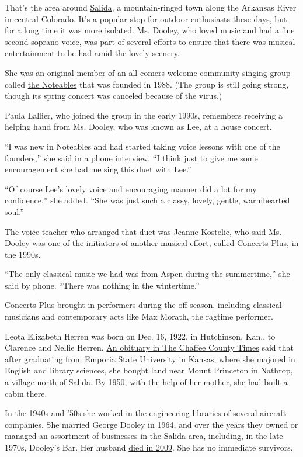 That's the area around \href{http://salida.com/}{Salida}, a
mountain-ringed town along the Arkansas River in central Colorado. It's
a popular stop for outdoor enthusiasts these days, but for a long time
it was more isolated. Ms. Dooley, who loved music and had a fine
second-soprano voice, was part of several efforts to ensure that there
was musical entertainment to be had amid the lovely scenery.

She was an original member of an all-comers-welcome community singing
group called \href{http://www.salidasings.org/noteables.html}{the
Noteables} that was founded in 1988. (The group is still going strong,
though its spring concert was canceled because of the virus.)

Paula Lallier, who joined the group in the early 1990s, remembers
receiving a helping hand from Ms. Dooley, who was known as Lee, at a
house concert.

``I was new in Noteables and had started taking voice lessons with one
of the founders,'' she said in a phone interview. ``I think just to give
me some encouragement she had me sing this duet with Lee.''

``Of course Lee's lovely voice and encouraging manner did a lot for my
confidence,'' she added. ``She was just such a classy, lovely, gentle,
warmhearted soul.''

The voice teacher who arranged that duet was Jeanne Kostelic, who said
Ms. Dooley was one of the initiators of another musical effort, called
Concerts Plus, in the 1990s.

``The only classical music we had was from Aspen during the
summertime,'' she said by phone. ``There was nothing in the
wintertime.''

Concerts Plus brought in performers during the off-season, including
classical musicians and contemporary acts like Max Morath, the ragtime
performer.

Leota Elizabeth Herren was born on Dec. 16, 1922, in Hutchinson, Kan.,
to Clarence and Nellie Herren.
\href{http://www.chaffeecountytimes.com/obituaries/leota-dooley/article_dcd20214-9c75-11ea-8bd5-b337d7f2b33f.html}{An
obituary in The Chaffee County Times} said that after graduating from
Emporia State University in Kansas, where she majored in English and
library sciences, she bought land near Mount Princeton in Nathrop, a
village north of Salida. By 1950, with the help of her mother, she had
built a cabin there.

In the 1940s and '50s she worked in the engineering libraries of several
aircraft companies. She married George Dooley in 1964, and over the
years they owned or managed an assortment of businesses in the Salida
area, including, in the late 1970s, Dooley's Bar. Her husband
\href{http://www.chaffeecountytimes.com/obituaries/george-d-dooley/article_ad3ee599-81d9-56f0-b918-78ea1abbea04.html}{died
in 2009}. She has no immediate survivors.

